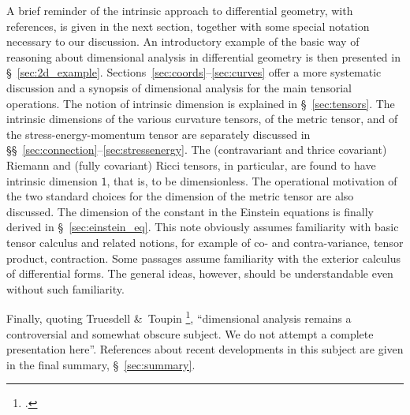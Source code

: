 \documentclass[\ifafour a4paper,12pt,\else a5paper,10pt,\fi%
onecolumn,oneside,article,%
british%
]{memoir}
\theoremstyle{remark}
\theoremstyle{innote}
\newcommand*{\citep}{\footcites}
\newcommand*{\amp}{\&}
\renewcommand*{\|}[1][]{\nonscript\,#1\vert\nonscript\;\mathopen{}}
\newcommand*{\sect}{\S}%
\newcommand*{\sects}{\S\S}%
\newcommand*{\Un}{\textsf{1}}
\begin{document}
A brief reminder of the intrinsic approach to differential geometry, with
references, is given in the next section, together with some special
notation necessary to our discussion. An introductory example of the basic
way of reasoning about dimensional analysis in differential geometry is
then presented in \sect~\ref{sec:2d_example}.
Sections~\ref{sec:coords}--\ref{sec:curves} offer a more systematic
discussion and a synopsis of dimensional analysis for the main tensorial
operations. The notion of intrinsic dimension is explained in
\sect~\ref{sec:tensors}. The intrinsic dimensions of the various curvature
tensors, of the metric tensor, and of the stress-energy-momentum tensor are
separately discussed in
\sects~\ref{sec:connection}--\ref{sec:stressenergy}. The (contravariant and
thrice covariant) Riemann and (fully covariant) Ricci tensors, in
particular, are found to have intrinsic dimension $\Un$, that is, to be
dimensionless. The operational motivation of the two standard choices for
the dimension of the metric tensor are also discussed. The dimension of the
constant in the Einstein equations is finally derived in
\sect~\ref{sec:einstein_eq}. This note obviously assumes familiarity with
basic tensor calculus and related notions, for example of co- and
contra-variance, tensor product, contraction. Some passages assume
familiarity with the exterior calculus of differential forms. The general
ideas, however, should be understandable even without such familiarity.








Finally, quoting Truesdell \amp\ Toupin \citep[Appendix \sect~7
footnote~4]{truesdelletal1960}, \enquote{dimensional analysis remains a
  controversial and somewhat obscure subject. We do not attempt a complete
  presentation here}. References about recent developments in this subject
are given in the final summary, \sect~\ref{sec:summary}.
\end{document}
